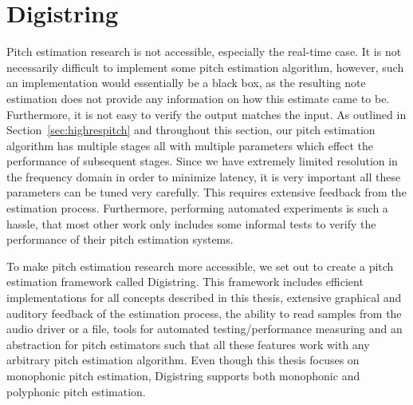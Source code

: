 \documentclass[a4paper,10pt,twocolumn]{article}
\begin{document}






\section{Digistring}
%
Pitch estimation research is not accessible, especially the real-time case. It is not necessarily difficult to implement some pitch estimation algorithm, however, such an implementation would essentially be a black box, as the resulting note estimation does not provide any information on how this estimate came to be. Furthermore, it is not easy to verify the output matches the input. As outlined in Section~\ref{sec:highrespitch} and throughout this section, our pitch estimation algorithm has multiple stages all with multiple parameters which effect the performance of subsequent stages. Since we have extremely limited resolution in the frequency domain in order to minimize latency, it is very important all these parameters can be tuned very carefully. This requires extensive feedback from the estimation process. Furthermore, performing automated experiments is such a hassle, that most other work only includes some informal tests to verify the performance of their pitch estimation systems.

To make pitch estimation research more accessible, we set out to create a pitch estimation framework called Digistring. This framework includes efficient implementations for all concepts described in this thesis, extensive graphical and auditory feedback of the estimation process, the ability to read samples from the audio driver or a file, tools for automated testing/performance measuring and an abstraction for pitch estimators such that all these features work with any arbitrary pitch estimation algorithm. Even though this thesis focuses on monophonic pitch estimation, Digistring supports both monophonic and polyphonic pitch estimation.
\end{document}
